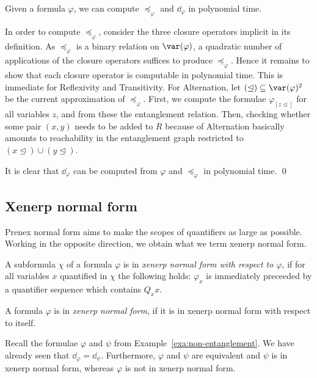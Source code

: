 \documentclass{LMCS}
\renewcommand{\phi}{\varphi}
\newcommand{\ad}{\dd_{\varphi}}
\newcommand{\refl}{Reflexivity}
\newcommand{\trans}{Transitivity}
\newcommand{\alt}{Alternation}
\begin{document}
\begin{lem}\label{lem:ead poly}
Given a formula $\phi$, 
we can compute $\preceq_{\phi}$ and $\ad$ in polynomial time. 
\end{lem}

\proof
In order to compute $\preceq_{\phi}$, 
consider the three closure operators implicit in its definition. 
As $\preceq_{\phi}$ is a binary relation on $\var(\phi)$, 
a quadratic number of applications of the closure operators 
suffices to produce $\preceq_{\phi}$. 
Hence it remains to show that each closure operator 
is computable in polynomial time. 
This is immediate for \refl{} and \trans. 
For \alt, let $(\trianglelefteq)\subseteq\var(\phi)^2$ 
be the current approximation of $\preceq_{\phi}$. 
First, we compute the formulae $\phi_{[z\trianglelefteq]}$ 
for all variables $z$, 
and from these the entanglement relation. 
Then, checking whether some pair $(x,y)$ 
needs to be added to $R$ because of \alt{} 
basically amounts to reachability in the entanglement graph 
restricted to $(x\trianglelefteq)\cup(y\trianglelefteq)$. 

It is clear that $\ad$ can be computed 
from $\phi$ and $\preceq_{\phi}$ in polynomial time. 
\qed


\subsection{Xenerp normal form}

Prenex normal form aims 
to make the scopes of quantifiers as large as possible. 
Working in the opposite direction, we obtain what we term xenerp normal form. 

\begin{defi}
A subformula $\chi$ of a formula $\phi$ 
is in \emph{xenerp normal form with respect to $\phi$}, 
if for all variables $x$ quantified in $\chi$ the following holds: 
$\phi_x$ is immediately preceeded 
by a quantifier sequence which contains $Q_xx$. 

A formula $\phi$ is in \emph{xenerp normal form}, 
if it is in xenerp normal form with respect to itself. 
\end{defi}


\begin{exa}\label{ex:xenerp}
Recall the formulae $\phi$ and $\psi$ from Example~\ref{exa:non-entanglement}. 
We have already seen that $\ad=\dd_{\psi}$. 
Furthermore, $\phi$ and $\psi$ are equivalent 
and $\psi$ is in xenerp normal form, 
whereas $\phi$ is not in xenerp normal form. 
\end{exa}
\end{document}
